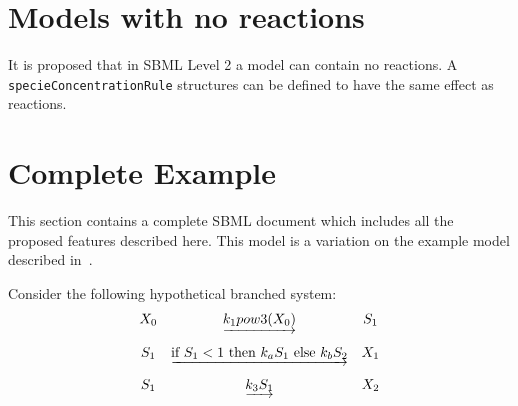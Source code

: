 \documentclass{cekarticle}
\begin{document}
\section{Models with no reactions}

It is proposed that in SBML Level 2 a model can contain no
reactions.  A \texttt{specieConcentrationRule} structures can be
defined to have the same effect as reactions.

\section{Complete Example}
\label{sec:example}

This section contains a complete SBML document which
includes all the proposed features described here.  This model is a
variation on the example model described in~\citet{hucka:2001}.

Consider the following hypothetical branched system:
\begin{equation*}
  \begin{array}{@{}ccc@{}}
    X_0 & \underrightarrow{k_1 pow3(X_0)} & S_1 \\ \\[-4pt]
    S_1 & \underrightarrow{\text{if $S_1 < 1$ then $k_a S_1$ else $k_b S_2$}} & X_1 \\ \\[-4pt]
    S_1 & \underrightarrow{k_3 S_1} & X_2
  \end{array}
\end{equation*}
\end{document}
